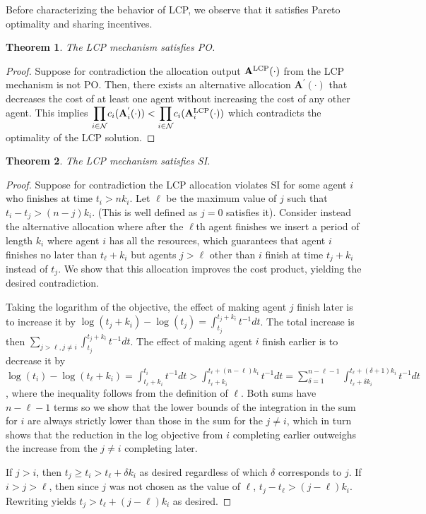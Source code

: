 \documentclass[letterpaper]{article} %
\newtheorem{theorem}{Theorem}
\theoremstyle{definition}
\begin{document}
Before characterizing the behavior of LCP, we observe that it satisfies Pareto optimality and sharing incentives.

\begin{theorem} \label{LCP-po}
The LCP mechanism satisfies PO.
\end{theorem}

\begin{proof}
Suppose for contradiction the allocation output $\mathbf{A}^{\textnormal{LCP}}(\cdot)$ from the LCP mechanism is not PO. Then, there exists an alternative allocation $\mathbf{A}^{'}(\cdot)$ that decreases the cost of at least one agent without increasing the cost of any other agent. This implies $\underset{i \in \mathcal{N}}{\displaystyle \prod}  c_{i}(\mathbf{A}^{'}_{i}(\cdot)) < \underset{i \in \mathcal{N}}{\displaystyle \prod}  c_{i}(\mathbf{A}^{\textnormal{LCP}}_{i}(\cdot))$ which contradicts the optimality of the LCP solution.
\end{proof}

\begin{theorem}
\label{thm:SI}
The LCP mechanism satisfies SI.
\end{theorem}

\begin{proof}
Suppose for contradiction the LCP allocation violates SI for some agent $i$ who finishes at time $t_i > n k_i$. 
Let $\ell$ be the maximum value of $j$ such that $t_i - t_j > (n - j)k_i$.  (This is well defined as $j=0$ satisfies it).
Consider instead the alternative allocation where after the $\ell$th agent finishes we insert a period of length $k_i$ where agent $i$ has all the resources, which guarantees that agent $i$ finishes no later than $t_\ell + k_i$ but agents $j > \ell$ other than $i$ finish at time $t_j + k_i$ instead of $t_j$.  We show that this allocation improves the cost product, yielding the desired contradiction.

Taking the logarithm of the objective, the effect of making agent $j$ finish later is to increase it by $\log(t_j+k_i) - \log(t_j) = \int_{t_j}^{t_j+k_i} t^{-1} dt$.  The total increase is then
$\sum_{j > \ell, j \neq i} \int_{t_j}^{t_j+k_i} t^{-1} dt$.
The effect of making agent $i$ finish earlier is to decrease it by $\log(t_i) - \log(t_\ell + k_i) = \int_{t_\ell + k_i}^{t_i} t^{-1} dt > \int_{t_\ell + k_i}^{t_\ell+(n-\ell)k_i} t^{-1} dt = \sum_{\delta = 1}^{n-\ell-1}\int_{t_\ell + \delta k_i}^{t_\ell+(\delta+1)k_i} t^{-1} dt$, where the inequality follows from the definition of $\ell$.  Both sums have $n-\ell-1$ terms so we show that the lower bounds of the integration in the sum for $i$ are always strictly lower than those in the sum for the $j\neq i$, which in turn shows that the reduction in the log objective from $i$ completing earlier outweighs the increase from the $j \neq i$ completing later.

If $j > i$, then $t_j \geq t_i > t_\ell + \delta k_i$ as desired regardless of which $\delta$ corresponds to $j$.  If $i > j > \ell$, then since $j$ was not chosen as the value of $\ell$, $t_j - t_\ell > (j-\ell)k_i$.  Rewriting yields $t_j > t_\ell + (j-\ell)k_i$ as desired.
\end{proof}
\end{document}
